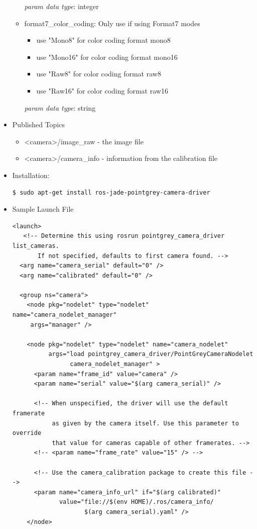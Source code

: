 \begin{itemize}
\begin{itemize}
\textit{param data type}: integer
\item format7\_color\_coding: Only use if using Format7 modes
\begin{itemize}
\item use "Mono8" for color coding format mono8
\item use "Mono16" for color coding format mono16
\item use "Raw8" for color coding format raw8
\item use "Raw16" for color coding format raw16
\end{itemize}
\textit{param data type}: string
\end{itemize}
\item Published Topics
\begin{itemize}
\item <camera>/image\_raw - the image file
\item <camera>/camera\_info - information from the calibration file
\end{itemize}
\item Installation: 
\begin{lstlisting}[language=bash]
$ sudo apt-get install ros-jade-pointgrey-camera-driver
\end{lstlisting}
\item Sample Launch File
\lstset{language=XML}
\begin{lstlisting}
<launch>
   <!-- Determine this using rosrun pointgrey_camera_driver list_cameras.
       If not specified, defaults to first camera found. -->
  <arg name="camera_serial" default="0" />
  <arg name="calibrated" default="0" />

  <group ns="camera">
    <node pkg="nodelet" type="nodelet" name="camera_nodelet_manager" 
     args="manager" />

    <node pkg="nodelet" type="nodelet" name="camera_nodelet"
          args="load pointgrey_camera_driver/PointGreyCameraNodelet 
                camera_nodelet_manager" >
      <param name="frame_id" value="camera" />
      <param name="serial" value="$(arg camera_serial)" />

      <!-- When unspecified, the driver will use the default framerate 
           as given by the camera itself. Use this parameter to override
           that value for cameras capable of other framerates. -->
      <!-- <param name="frame_rate" value="15" /> -->
      
      <!-- Use the camera_calibration package to create this file -->
      <param name="camera_info_url" if="$(arg calibrated)"
             value="file://$(env HOME)/.ros/camera_info/
                    $(arg camera_serial).yaml" />
    </node>


\end{lstlisting}
\end{itemize}
